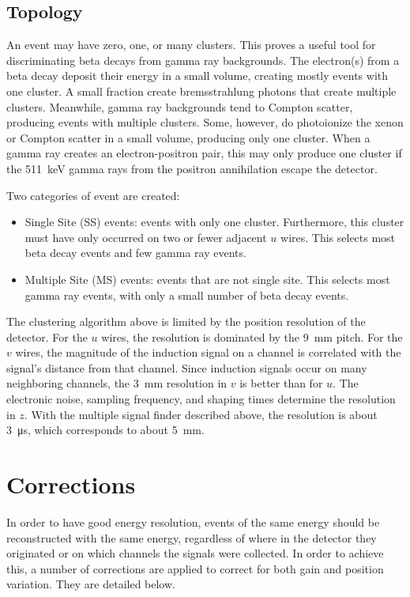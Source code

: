 \documentclass[herrin-thesis.tex]{subfiles}
\begin{document}
\subsection{Topology}
\label{sec:data_topology}
An event may have zero, one, or many clusters. This proves a useful tool for discriminating beta decays from gamma ray backgrounds. The electron(s) from a beta decay deposit their energy in a small volume, creating mostly events with one cluster. A small fraction create bremsstrahlung photons that create multiple clusters. Meanwhile, gamma ray backgrounds tend to Compton scatter, producing events with multiple clusters. Some, however, do photoionize the xenon or Compton scatter in a small volume, producing only one cluster. When a gamma ray creates an electron-positron pair, this may only produce one cluster if the \SI{511}{\keV} gamma rays from the positron annihilation escape the detector.

Two categories of event are created:
\begin{itemize}
\item Single Site (SS) events: events with only one cluster. Furthermore, this cluster must have only occurred on two or fewer adjacent \(u\) wires. This selects most beta decay events and few gamma ray events.
\item Multiple Site (MS) events: events that are not single site. This selects most gamma ray events, with only a small number of beta decay events.
\end{itemize}

The clustering algorithm above is limited by the position resolution of the detector. For the \(u\) wires, the resolution is dominated by the \SI{9}{\mm} pitch. For the \(v\) wires, the magnitude of the induction signal on a channel is correlated with the signal's distance from that channel. Since induction signals occur on many neighboring channels, the \SI{3}{\mm} resolution in \(v\) is better than for \(u\). The electronic noise, sampling frequency, and shaping times determine the resolution in \(z\). With the multiple signal finder described above, the resolution is about \SI{3}{\micro\s}, which corresponds to about \SI{5}{\mm}.

\section{Corrections}
\label{sec:data_corrections}
In order to have good energy resolution, events of the same energy should be reconstructed with the same energy, regardless of where in the detector they originated or on which channels the signals were collected. In order to achieve this, a number of corrections are applied to correct for both gain and position variation. They are detailed below.
\end{document}
